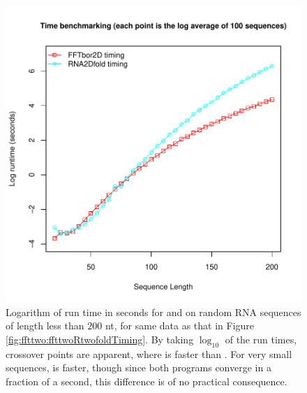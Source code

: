 \begin{figure}[!h]
\centering
\includegraphics[width=.9\textwidth]{Figures/FFTbor2D/ffttwoRtwofoldLogScale.pdf}
 \caption{
Logarithm of run time in seconds for \rtwofold and \ffttwo
on random RNA sequences of length less than $200$ nt, for same data as that
in Figure \ref{fig:ffttwo:ffttwoRtwofoldTiming}.
By taking $\log_{10}$ of the run times,
crossover points are apparent,
where \ffttwo is faster than \rtwofold. For very small
sequences, \rtwofold is faster, though since both programs converge
in a fraction of a second, this difference is of no practical consequence.
}
\label{fig:ffttwo:ffttwoRtwofoldLogScale}
\end{figure}


